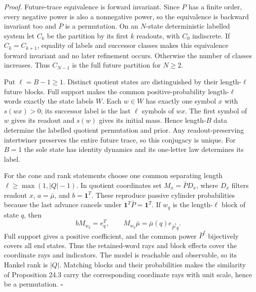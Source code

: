 \documentclass[
]{article}
\begin{document}
\emph{Proof.} Future-trace equivalence is forward invariant. Since \(P\)
has a finite order, every negative power is also a nonnegative power, so
the equivalence is backward invariant too and \(\bar P\) is a
permutation. On an \(N\)-state deterministic labelled system let \(C_k\)
be the partition by its first \(k\) readouts, with \(C_0\) indiscrete.
If \(C_k=C_{k+1}\), equality of labels and successor classes makes this
equivalence forward invariant and no later refinement occurs. Otherwise
the number of classes increases. Thus \(C_{N-1}\) is the full future
partition for \(N\ge2\).

Put \(\ell=B-1\ge1\). Distinct quotient states are distinguished by
their length-\(\ell\) future blocks. Full support makes the common
positive-probability length-\(\ell\) words exactly the state labels
\(W\). Each \(w\in W\) has exactly one symbol \(x\) with \(s(wx)>0\);
its successor label is the last \(\ell\) symbols of \(wx\). The first
symbol of \(w\) gives its readout and \(s(w)\) gives its initial mass.
Hence length-\(B\) data determine the labelled quotient permutation and
prior. Any readout-preserving intertwiner preserves the entire future
trace, so this conjugacy is unique. For \(B=1\) the sole state has
identity dynamics and its one-letter law determines its label.

For the cone and rank statements choose one common separating length
\(\ell\ge\max(1,|Q|-1)\). In quotient coordinates set
\(M_x=\bar P D_x\), where \(D_x\) filters readout \(x\), \(a=\bar\mu\),
and \(b=\mathbf1^T\). These reproduce passive cylinder probabilities
because the last advance cancels under \(\mathbf1^T\bar P=\mathbf1^T\).
If \(w_q\) is the length-\(\ell\) block of state \(q\), then \[
bM_{w_q}=e_q^T,\qquad
M_{w_q}\bar\mu=\bar\mu(q)e_{\bar P^\ell q}.
\] Full support gives a positive coefficient, and the common power
\(\bar P^\ell\) bijectively covers all end states. Thus the
retained-word rays and block effects cover the coordinate rays and
indicators. The model is reachable and observable, so its Hankel rank is
\(|Q|\). Matching blocks and their probabilities makes the similarity of
Proposition 24.3 carry the corresponding coordinate rays with unit
scale, hence be a permutation. \(\square\)
\end{document}
